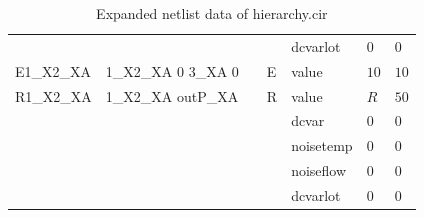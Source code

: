 \begin{table}[h]
\begin{tabular}[c]{lllllll}
\rowcolor{myyellow}
 & & & &\small{dcvarlot} &$0$ &$0$ \\ 
\small{E1\_X2\_XA} &\small{1\_X2\_XA 0 3\_XA 0 } & &\small{E} &\small{value} &$10$ &$10$ \\ 
\rowcolor{myyellow}
\small{R1\_X2\_XA} &\small{1\_X2\_XA outP\_XA } & &\small{R} &\small{value} &$R$ &$50$ \\ 
 & & & &\small{dcvar} &$0$ &$0$ \\ 
\rowcolor{myyellow}
 & & & &\small{noisetemp} &$0$ &$0$ \\ 
 & & & &\small{noiseflow} &$0$ &$0$ \\ 
\rowcolor{myyellow}
 & & & &\small{dcvarlot} &$0$ &$0$ \\ 
\end{tabular}
\caption{Expanded netlist data of hierarchy.cir}
\end{table}

